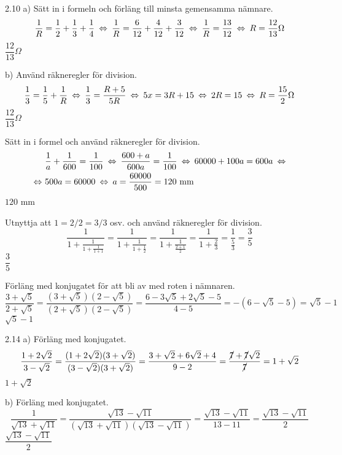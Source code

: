 \begin{task}{2.10 a)}
	Sätt in i formeln och förläng till minsta gemensamma nämnare.
	\[\frac{1}{R}=\frac{1}{2}+\frac{1}{3}+\frac{1}{4} \lra
	\frac{1}{R}=\frac{6}{12}+ \frac{4}{12}+\frac{3}{12} \lra
	\frac{1}{R}=\frac{13}{12} \lra
	R=\frac{12}{13}\Omega\]
	\ans $\dfrac{12}{13}\Omega$
\end{task}

\begin{task}{b)}
	Använd räkneregler för division.
	\[\frac{1}{3}=\frac{1}{5}+\frac{1}{R} \lra
	\frac{1}{3}=\frac{R+5}{5R} \lra
	5x=3R+15 \lra
	2R=15 \lra
	R=\frac{15}{2} \Omega\]
	\ans $\dfrac{12}{13}\Omega$
\end{task}

\begin{task}{2.11}
	Sätt in i formel och använd räkneregler för division.
	\begin{align*}
	& \frac{1}{a}+\frac{1}{600}=\frac{1}{100} \lra
	\frac{600+a}{600a}=\frac{1}{100} \lra
	60000+100a=600a \lra \\ \lra
	& 500a=60000 \lra
	a=\frac{60000}{500}=120\text{ mm}
	\end{align*}
	\ans $120$ mm
\end{task}

\begin{task}{2.12}
	Utnyttja att $1=2/2=3/3$ osv. och använd räkneregler för division.
	\[\dfrac{1}{1+\frac{1}{1+\frac{1}{1+1}}}=
	\dfrac{1}{1+\frac{1}{1+\frac{1}{2}}}=
	\dfrac{1}{1+\frac{1}{\frac{2+1}{2}}}=
	\dfrac{1}{1+\frac{2}{3}}=
	\dfrac{1}{\frac{5}{3}}=
	\dfrac{3}{5}\]
	\ans $\dfrac{3}{5}$
\end{task}

\begin{task}{2.13}
	Förläng med konjugatet för att bli av med roten i nämnaren.
	\[\dfrac{3+\sqrt{5}}{2+\sqrt{5}}=
	\dfrac{(3+\sqrt{5})(2-\sqrt{5})}{(2+\sqrt{5})(2-\sqrt{5})}=
	\dfrac{6-3\sqrt{5}+2\sqrt{5}-5}{4-5}=
	-(6-\sqrt{5}-5)=
	\sqrt{5}-1\]
	\ans $\sqrt{5}-1$
\end{task}

\begin{task}{2.14 a)}
	Förläng med konjugatet.
	\[\dfrac{1+2\sqrt{2}}{3-\sqrt{2}}=
	\dfrac{(1+2\sqrt{2})(3+\sqrt{2})}{(3-\sqrt{2})(3+\sqrt{2})}=
	\dfrac{3+\sqrt{2}+6\sqrt{2}+4}{9-2}=
	\dfrac{\cancel{7}+\cancel{7}\sqrt{2}}{\cancel{7}}=
	1+\sqrt{2}\]
	\ans $1+\sqrt{2}$
\end{task}

\begin{task}{b)}
	Förläng med konjugatet.
	\[\dfrac{1}{\sqrt{13}+\sqrt{11}}=
	\dfrac{\sqrt{13}-\sqrt{11}}{(\sqrt{13}+\sqrt{11})(\sqrt{13}-\sqrt{11})}=
	\dfrac{\sqrt{13}-\sqrt{11}}{13-11}=
	\dfrac{\sqrt{13}-\sqrt{11}}{2}\]
	\ans $\dfrac{\sqrt{13}-\sqrt{11}}{2}$
\end{task}